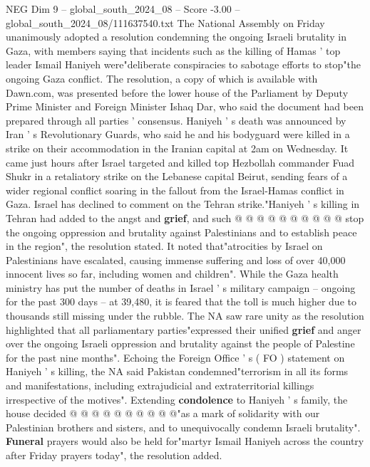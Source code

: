 \begin{textsample}{NEG Dim 9 – global\_south\_2024\_08 – Score -3.00 – global\_south\_2024\_08/111637540.txt}  \label{ex:f9_neg_390}
The National Assembly on Friday unanimously adopted a resolution condemning the ongoing Israeli brutality in Gaza, with members saying that incidents such as the killing of Hamas ' top leader Ismail Haniyeh were"deliberate conspiracies to sabotage efforts to stop"the ongoing Gaza conflict.
The resolution, a copy of which is available with Dawn.com, was presented before the lower house of the Parliament by Deputy Prime Minister and Foreign Minister Ishaq Dar, who said the document had been prepared through all parties ' consensus.
Haniyeh ' s death was announced by Iran ' s Revolutionary Guards, who said he and his bodyguard were killed in a strike on their accommodation in the Iranian capital at 2am on Wednesday.
It came just hours after Israel targeted and killed top Hezbollah commander Fuad Shukr in a retaliatory strike on the Lebanese capital Beirut, sending fears of a wider regional conflict soaring in the fallout from the Israel-Hamas conflict in Gaza.
Israel has declined to comment on the Tehran strike."Haniyeh ' s killing in Tehran had added to the angst and \textbf{grief}, and such @ @ @ @ @ @ @ @ @ @ stop the ongoing oppression and brutality against Palestinians and to establish peace in the region", the resolution stated.
It noted that"atrocities by Israel on Palestinians have escalated, causing immense suffering and loss of over 40,000 innocent lives so far, including women and children".
While the Gaza health ministry has put the number of deaths in Israel ' s military campaign -- ongoing for the past 300 days -- at 39,480, it is feared that the toll is much higher due to thousands still missing under the rubble.
The NA saw rare unity as the resolution highlighted that all parliamentary parties"expressed their unified \textbf{grief} and anger over the ongoing Israeli oppression and brutality against the people of Palestine for the past nine months".
Echoing the Foreign Office ' s ( FO ) statement on Haniyeh ' s killing, the NA said Pakistan condemned"terrorism in all its forms and manifestations, including extrajudicial and extraterritorial killings irrespective of the motives".
Extending \textbf{condolence} to Haniyeh ' s family, the house decided @ @ @ @ @ @ @ @ @ @"as a mark of solidarity with our Palestinian brothers and sisters, and to unequivocally condemn Israeli brutality". \textbf{Funeral} prayers would also be held for"martyr Ismail Haniyeh across the country after Friday prayers today", the resolution added.

\end{textsample}
